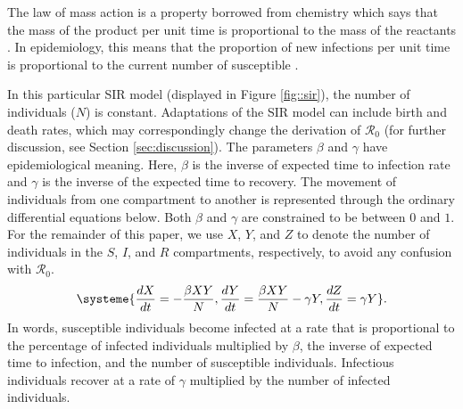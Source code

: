\documentclass[12pt]{article}
\newcommand{\rr}{\ensuremath{\mathcal{R}_0}}
\begin{document}
The law of mass action is a property borrowed from chemistry which says that the mass of the product per unit time is proportional to the mass of the reactants \citep{lotka1920}.  In epidemiology, this means that the proportion of new infections per unit time is proportional to the current  number of susceptible \citep{anderson1992}.  


In this particular  SIR model (displayed in Figure \ref{fig::sir}), the number of individuals ($N$) is constant. Adaptations of the SIR model can include birth and death rates, which may correspondingly change the derivation of $\rr$ (for further discussion, see Section \ref{sec:discussion}). The parameters  $\beta$ and $\gamma$ have epidemiological meaning.  Here, $\beta$ is the inverse of expected time to infection rate and $\gamma$ is the inverse of the expected time to recovery.  The movement of individuals from one compartment to another is represented through the ordinary differential equations below.  Both $\beta$ and $\gamma$ are constrained to be between $0$ and $1$.  For the remainder of this paper, we use $X$, $Y$, and $Z$ to denote the number of individuals in the $S$, $I$, and $R$ compartments, respectively, to avoid any confusion with $\rr$.
\begin{align}
\systeme{\frac{dX}{dt} = -\frac{\beta XY}{N}, \frac{dY}{dt} = \frac{\beta XY}{N} - \gamma Y, \frac{dZ}{dt} = \gamma Y}. \label{eq:sir}
\end{align}
In words, susceptible individuals become infected at a rate that is proportional to the percentage of infected individuals multiplied by $\beta$, the inverse of expected time to infection, and the number of susceptible individuals.  Infectious individuals recover at a rate of $\gamma$ multiplied by the number of infected individuals.
\end{document}
